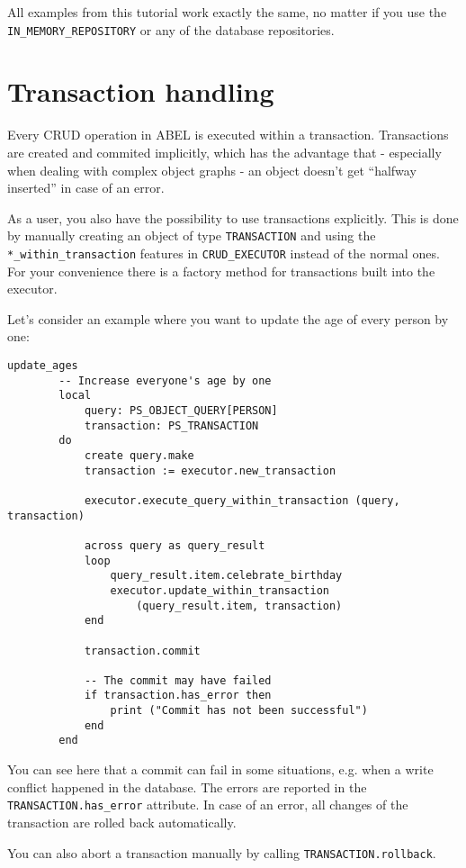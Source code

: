 All examples from this tutorial work exactly the same, no matter if you use the \lstinline!IN_MEMORY_REPOSITORY! or any of the database repositories.


\section{Transaction handling}

Every CRUD operation in ABEL is executed within a transaction. 
Transactions are created and commited implicitly, which has the advantage that - especially when dealing with complex object graphs - an object doesn't get ``halfway inserted'' in case of an error.

As a user, you also have the possibility to use transactions explicitly. 
This is done by manually creating an object of type \lstinline!TRANSACTION! and using the \lstinline!*_within_transaction! features in \lstinline!CRUD_EXECUTOR! instead of the normal ones.
For your convenience there is a factory method for transactions built into the executor.

Let's consider an example where you want to update the age of every person by one:

\begin{lstlisting}[language=OOSC2Eiffel, captionpos=b, caption={}, label={lst:update_all_ages}]
	update_ages
		-- Increase everyone's age by one
		local
			query: PS_OBJECT_QUERY[PERSON]
			transaction: PS_TRANSACTION
		do
			create query.make
			transaction := executor.new_transaction

			executor.execute_query_within_transaction (query, transaction)

			across query as query_result
			loop
				query_result.item.celebrate_birthday
				executor.update_within_transaction 
					(query_result.item, transaction)
			end

			transaction.commit

			-- The commit may have failed
			if transaction.has_error then
				print ("Commit has not been successful")
			end
		end
\end{lstlisting}

You can see here that a commit can fail in some situations, e.g. when a write conflict happened in the database.
The errors are reported in the \lstinline!TRANSACTION.has_error! attribute.
In case of an error, all changes of the transaction are rolled back automatically.

You can also abort a transaction manually by calling \lstinline!TRANSACTION.rollback!. 

